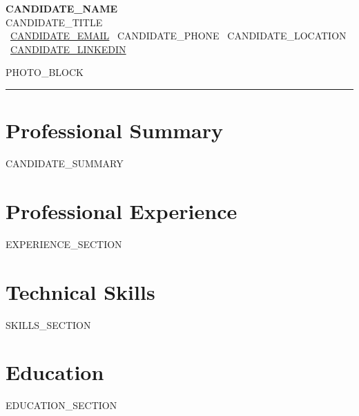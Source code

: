 \documentclass[10pt,a4paper]{article}
\begin{document}
\pagestyle{empty}

\begin{minipage}[t]{0.72\textwidth}
  \vspace{0pt}
  {\LARGE\bfseries\color{maincolor} {{CANDIDATE_NAME}}}\\[2pt]
  {\small\color{darkgray} {{CANDIDATE_TITLE}}}\\[4pt]
  \textcolor{medgray}{
    \scriptsize
    \faEnvelope\ \href{mailto:{{CANDIDATE_EMAIL}}}{{{CANDIDATE_EMAIL}}}
    \quad
    \faPhone\ {{CANDIDATE_PHONE}}
    \quad
    \faMapMarker*\ {{CANDIDATE_LOCATION}}
  }\\[1pt]
  \textcolor{medgray}{
    \scriptsize
    \ifx{}\empty\else
      \faLinkedin\ \href{{{CANDIDATE_LINKEDIN_URL}}}{{{CANDIDATE_LINKEDIN}}}
    \fi
  }
\end{minipage}%
\hfill
\begin{minipage}[t]{0.25\textwidth}
  \vspace{0pt}
  \raggedleft
  {{PHOTO_BLOCK}}
\end{minipage}

\vspace{3pt}
\noindent\color{maincolor}\rule{\textwidth}{1pt}

\ifx{}\empty\else
\section{Professional Summary}
\noindent\small {{CANDIDATE_SUMMARY}}
\fi

\section{Professional Experience}
{{EXPERIENCE_SECTION}}

\section{Technical Skills}
\noindent\small {{SKILLS_SECTION}}

\section{Education}
{{EDUCATION_SECTION}}
\end{document}
